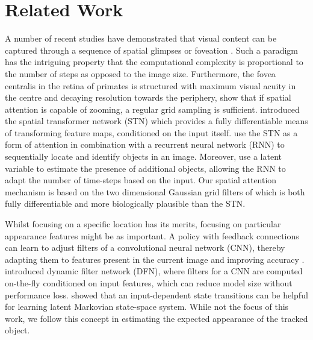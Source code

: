 \section{Related Work}
\label{sec:background}

A number of recent studies have demonstrated that visual content can be captured through a sequence of spatial glimpses or foveation \cite{Graves2014recurrent, Wierstra2015draw}. Such a paradigm has the intriguing property that the computational complexity is proportional to the number of steps as opposed to the image size.
Furthermore, the fovea centralis in the retina of primates is structured with maximum visual acuity in the centre and decaying resolution towards the periphery, \citet{Olshausen2016foveal} show that if spatial attention is capable of zooming, a regular grid sampling is sufficient. 
\citet{Jaderberg2015} introduced the spatial transformer network (STN) which provides a fully differentiable means of transforming feature maps, conditioned on the input itself. \citet{Eslami2016} use the STN as a form of attention in combination with a recurrent neural network (RNN) to sequentially locate and identify objects in an image. Moreover, \citet{Eslami2016} use a latent variable to estimate the presence of additional objects, allowing the RNN to adapt the number of time-steps based on the input. 
Our spatial attention mechanism is based on the two dimensional Gaussian grid filters of  \cite{Kahou2015ratm} which is both fully differentiable and more biologically plausible than the STN.  


    
Whilst focusing on a specific location has its merits, focusing on particular appearance features might be as important. A policy with feedback connections can learn to adjust filters of a convolutional neural network (CNN), thereby adapting them to features present in the current image and improving accuracy \cite{Stollenga2014}. \citet{Brabandere2016dfn} introduced dynamic filter network (DFN), where filters for a CNN are computed on-the-fly conditioned on input features, which can reduce model size without performance loss. \citet{Karl2017} showed that an input-dependent state transitions can be helpful for learning latent Markovian state-space system. While not the focus of this work, we follow this concept in estimating the expected appearance of the tracked object.
    

